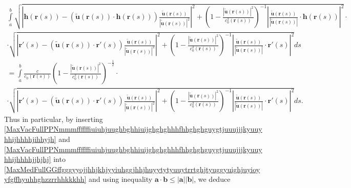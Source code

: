 \documentclass{article}
\theoremstyle{definition}
\theoremstyle{remark}
\renewcommand{\vec}[1]{\mathbf{#1}}
\newcommand{\er}{\eqref}
\newcommand{\er}{\eqref}
\begin{document}
\begin{multline}\label{MaxMedFullGGffgggyyojjhhjkhjyyiuhggjhhjhuyytytyuuytrrtghjtyuggyuighjuyioyyfgffhyuhhghzzrrhhkkkhh}
\int\limits_a^b\sqrt{\left|\vec h\left(\vec r(s)\right)-\left(\vec
{\tilde u}\left(\vec r(s)\right)\cdot\vec h\left(\vec
r(s)\right)\right)\frac{\vec {\tilde u}\left(\vec
r(s)\right)}{\left|\vec {\tilde u}\left(\vec
r(s)\right)\right|^2}\right|^2+\left(1-\frac{\left|\vec {\tilde
u}\left(\vec r(s)\right)\right|^2}{c^2_0\left(\vec
r(s)\right)}\right)^{-1}\left|\frac{\vec {\tilde u}\left(\vec
r(s)\right)}{\left|\vec {\tilde u}\left(\vec
r(s)\right)\right|}\cdot\vec h\left(\vec r(s)\right)\right|^2}
\cdot\\
\cdot\sqrt{\left|\vec r'(s)-\left(\vec {\tilde u}\left(\vec
r(s)\right)\cdot\vec r'(s)\right)\frac{\vec {\tilde u}\left(\vec
r(s)\right)}{\left|\vec {\tilde u}\left(\vec
r(s)\right)\right|^2}\right|^2+\left(1-\frac{\left|\vec {\tilde
u}\left(\vec r(s)\right)\right|^2}{c^2_0\left(\vec
r(s)\right)}\right)^{-1}\left|\frac{\vec {\tilde u}\left(\vec
r(s)\right)}{\left|\vec {\tilde u}\left(\vec
r(s)\right)\right|}\cdot\vec r'(s)\right|^2}ds
\\=\int\limits_a^b\frac{c}{c_0\left(\vec
r(s)\right)}\left(1-\frac{\left|\vec {\tilde u}\left(\vec
r(s)\right)\right|^2}{c^2_0\left(\vec
r(s)\right)}\right)^{-\frac{1}{2}}
\cdot\\
\cdot\sqrt{\left|\vec r'(s)-\left(\vec {\tilde u}\left(\vec
r(s)\right)\cdot\vec r'(s)\right)\frac{\vec {\tilde u}\left(\vec
r(s)\right)}{\left|\vec {\tilde u}\left(\vec
r(s)\right)\right|^2}\right|^2+\left(1-\frac{\left|\vec {\tilde
u}\left(\vec r(s)\right)\right|^2}{c^2_0\left(\vec
r(s)\right)}\right)^{-1}\left|\frac{\vec {\tilde u}\left(\vec
r(s)\right)}{\left|\vec {\tilde u}\left(\vec
r(s)\right)\right|}\cdot\vec r'(s)\right|^2}ds.
\end{multline}
Thus in particular, by inserting
\er{MaxVacFullPPNmmmffffffiuiuhjuughbghhiuijghghghhhfhhghghguygtjuuujjjkyuuyhhijhhhhjihhyjh}
and
\er{MaxVacFullPPNmmmffffffiuiuhjuughbghhiuijghghghhhfhhghghguygtjuuujjjkyuuyhhijhhhhjjhjhj}
into
\er{MaxMedFullGGffgggyyojjhhjkhjyyiuhggjhhjhuyytytyuuytrrtghjtyuggyuighjuyioyyfgffhyuhhghzzrrhhkkkhh}
and using inequality $\vec a\cdot\vec b\leq |\vec a||\vec b|$, we
deduce
\end{document}
